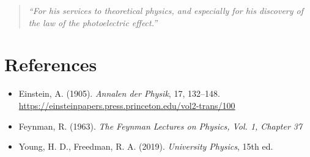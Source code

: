 \documentclass[12pt]{article}
\begin{document}
\begin{quote}
    \emph{``For his services to theoretical physics, and especially for his discovery of the law of the photoelectric effect.''}
\end{quote}

\section*{References}
\begin{itemize}
    \item Einstein, A. (1905). \emph{Annalen der Physik}, 17, 132--148. \url{https://einsteinpapers.press.princeton.edu/vol2-trans/100}
    \item Feynman, R. (1963). \emph{The Feynman Lectures on Physics, Vol. 1, Chapter 37}
    \item Young, H. D., Freedman, R. A. (2019). \emph{University Physics}, 15th ed.
\end{itemize}
\end{document}
